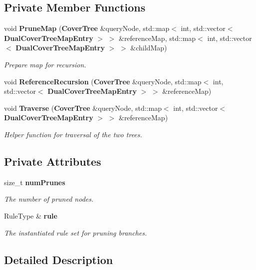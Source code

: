 \subsection*{Private Member Functions}
\begin{DoxyCompactItemize}
\item 
void {\bf Prune\+Map} ({\bf Cover\+Tree} \&query\+Node, std\+::map$<$ int, std\+::vector$<$ {\bf Dual\+Cover\+Tree\+Map\+Entry} $>$ $>$ \&reference\+Map, std\+::map$<$ int, std\+::vector$<$ {\bf Dual\+Cover\+Tree\+Map\+Entry} $>$ $>$ \&child\+Map)
\begin{DoxyCompactList}\small\item\em Prepare map for recursion. \end{DoxyCompactList}\item 
void {\bf Reference\+Recursion} ({\bf Cover\+Tree} \&query\+Node, std\+::map$<$ int, std\+::vector$<$ {\bf Dual\+Cover\+Tree\+Map\+Entry} $>$ $>$ \&reference\+Map)
\item 
void {\bf Traverse} ({\bf Cover\+Tree} \&query\+Node, std\+::map$<$ int, std\+::vector$<$ {\bf Dual\+Cover\+Tree\+Map\+Entry} $>$ $>$ \&reference\+Map)
\begin{DoxyCompactList}\small\item\em Helper function for traversal of the two trees. \end{DoxyCompactList}\end{DoxyCompactItemize}
\subsection*{Private Attributes}
\begin{DoxyCompactItemize}
\item 
size\+\_\+t {\bf num\+Prunes}
\begin{DoxyCompactList}\small\item\em The number of pruned nodes. \end{DoxyCompactList}\item 
Rule\+Type \& {\bf rule}
\begin{DoxyCompactList}\small\item\em The instantiated rule set for pruning branches. \end{DoxyCompactList}\end{DoxyCompactItemize}


\subsection{Detailed Description}
